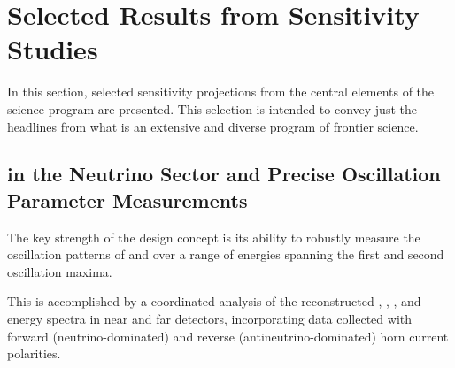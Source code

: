 \section{Selected Results from Sensitivity Studies}
\label{sec:exec-phys-sensitiv-results}

In this section, selected sensitivity projections from the 
central elements of the  science program are presented.  
This selection is intended to convey just the headlines from 
what is an extensive and diverse program of frontier science.

\subsection{ in the Neutrino 
Sector and Precise Oscillation Parameter Measurements}
\label{sec:es:phys:cpv}

The key strength of the  design concept is its ability to 
robustly measure the oscillation patterns of \numu and \anumu 
over a range of energies spanning the first and second 
oscillation maxima. 

This is accomplished by a coordinated analysis of the 
reconstructed \numu, \anumu, \nue, and \anue energy spectra 
in near and far detectors, 
incorporating data collected with forward (neutrino-dominated) 
and reverse (antineutrino-dominated) horn current polarities.  

